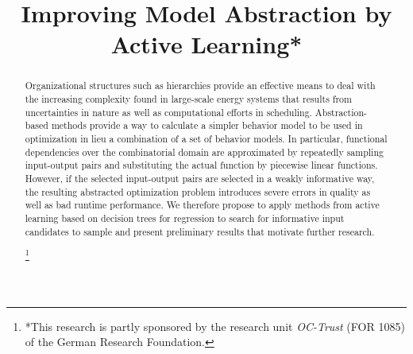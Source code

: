\documentclass[conference]{IEEEtran}
\newcommand{\noteg}[1]{\sethlcolor{highlightgreen} \hl{\textbf{NOTE:} #1}}
\newcommand\blfootnote[1]{%
  \begingroup
  \renewcommand\thefootnote{}\footnote{#1}%
  \addtocounter{footnote}{-1}%
  \endgroup
}
\begin{document}
\title{Improving Model Abstraction by Active Learning*}

\author{
}

\maketitle

\begin{abstract}
Organizational structures such as hierarchies provide an effective means to
deal with the increasing complexity found in large-scale energy systems that 
results from uncertainties in nature as well as computational efforts in scheduling. 
Abstraction-based methods provide a way to calculate a simpler behavior model 
to be used in optimization in lieu a combination of a set of behavior models.
In particular, functional dependencies over the combinatorial domain 
are approximated by repeatedly sampling input-output pairs
and substituting the actual function by piecewise linear functions. However, if
the selected input-output pairs are selected in a weakly informative way, the resulting abstracted
optimization problem introduces severe errors in quality as well as bad runtime performance.
We therefore propose to apply methods from active learning based on decision trees for regression
to search for informative
input candidates to sample and present preliminary results that motivate further research. 

\blfootnote{*This research is partly sponsored by the research unit \emph{OC-Trust} (FOR 1085) of the German Research Foundation.}
\end{abstract}

\end{document}
